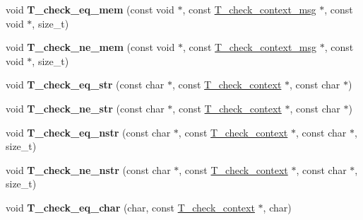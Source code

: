 \begin{DoxyCompactItemize}
void {\bfseries T\+\_\+check\+\_\+eq\+\_\+mem} (const void $\ast$, const \mbox{\hyperlink{structT__check__context__msg}{T\+\_\+check\+\_\+context\+\_\+msg}} $\ast$, const void $\ast$, size\+\_\+t)
\item 
\mbox{\label{group__RTEMSTestFrameworkImpl_gabab770906ede6c161cef959cdf7ebf78}} 
void {\bfseries T\+\_\+check\+\_\+ne\+\_\+mem} (const void $\ast$, const \mbox{\hyperlink{structT__check__context__msg}{T\+\_\+check\+\_\+context\+\_\+msg}} $\ast$, const void $\ast$, size\+\_\+t)
\item 
\mbox{\label{group__RTEMSTestFrameworkImpl_gac758fa0ef84461eb63916c268cc29443}} 
void {\bfseries T\+\_\+check\+\_\+eq\+\_\+str} (const char $\ast$, const \mbox{\hyperlink{structT__check__context}{T\+\_\+check\+\_\+context}} $\ast$, const char $\ast$)
\item 
\mbox{\label{group__RTEMSTestFrameworkImpl_gae342180c6c10078d3a2141485112f560}} 
void {\bfseries T\+\_\+check\+\_\+ne\+\_\+str} (const char $\ast$, const \mbox{\hyperlink{structT__check__context}{T\+\_\+check\+\_\+context}} $\ast$, const char $\ast$)
\item 
\mbox{\label{group__RTEMSTestFrameworkImpl_ga070904ecf9361fb52452aaa453b8fb18}} 
void {\bfseries T\+\_\+check\+\_\+eq\+\_\+nstr} (const char $\ast$, const \mbox{\hyperlink{structT__check__context}{T\+\_\+check\+\_\+context}} $\ast$, const char $\ast$, size\+\_\+t)
\item 
\mbox{\label{group__RTEMSTestFrameworkImpl_ga395049baccb7c171029c85a44346f2ed}} 
void {\bfseries T\+\_\+check\+\_\+ne\+\_\+nstr} (const char $\ast$, const \mbox{\hyperlink{structT__check__context}{T\+\_\+check\+\_\+context}} $\ast$, const char $\ast$, size\+\_\+t)
\item 
\mbox{\label{group__RTEMSTestFrameworkImpl_ga6350102e15a302c4b8a947d810f6c232}} 
void {\bfseries T\+\_\+check\+\_\+eq\+\_\+char} (char, const \mbox{\hyperlink{structT__check__context}{T\+\_\+check\+\_\+context}} $\ast$, char)
\item 
\mbox{\label{group__RTEMSTestFrameworkImpl_gabbad80708d8e9ba4756914b052ab7948}} 

\end{DoxyCompactItemize}
